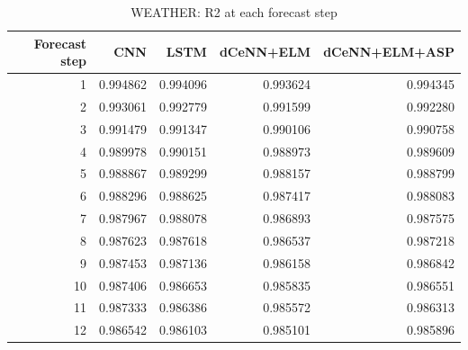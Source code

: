\begin{table}
\caption{WEATHER: R2 at each forecast step}
\begin{tabular}{rrrrr}
\toprule
Forecast step & CNN & LSTM & dCeNN+ELM & dCeNN+ELM+ASP \\
\midrule
1 & 0.994862 & 0.994096 & 0.993624 & 0.994345 \\
2 & 0.993061 & 0.992779 & 0.991599 & 0.992280 \\
3 & 0.991479 & 0.991347 & 0.990106 & 0.990758 \\
4 & 0.989978 & 0.990151 & 0.988973 & 0.989609 \\
5 & 0.988867 & 0.989299 & 0.988157 & 0.988799 \\
6 & 0.988296 & 0.988625 & 0.987417 & 0.988083 \\
7 & 0.987967 & 0.988078 & 0.986893 & 0.987575 \\
8 & 0.987623 & 0.987618 & 0.986537 & 0.987218 \\
9 & 0.987453 & 0.987136 & 0.986158 & 0.986842 \\
10 & 0.987406 & 0.986653 & 0.985835 & 0.986551 \\
11 & 0.987333 & 0.986386 & 0.985572 & 0.986313 \\
12 & 0.986542 & 0.986103 & 0.985101 & 0.985896 \\
\bottomrule
\end{tabular}
\end{table}

